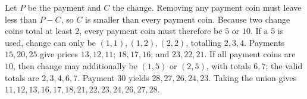 Let $P$ be the payment and $C$ the change. Removing any payment coin must leave less than $P-C$, so $C$ is smaller than every payment coin. Because two change coins total at least $2$, every payment coin must therefore be $5$ or $10$. If a $5$ is used, change can only be $(1,1),(1,2),(2,2)$, totalling $2,3,4$. Payments $15,20,25$ give prices $13,12,11$; $18,17,16$; and $23,22,21$. If all payment coins are $10$, then change may additionally be $(1,5)$ or $(2,5)$, with totals $6,7$; the valid totals are $2,3,4,6,7$. Payment $30$ yields $28,27,26,24,23$. Taking the union gives $\boxed{11,12,13,16,17,18,21,22,23,24,26,27,28}$.
